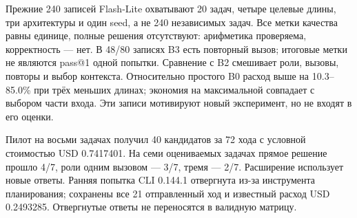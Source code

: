 
Прежние 240 записей Flash-Lite охватывают 20 задач, четыре целевые длины, три архитектуры и один seed, а не 240 независимых задач. Все метки качества равны единице, полные решения отсутствуют: арифметика проверяема, корректность --- нет. В 48/80 записях B3 есть повторный вызов; итоговые метки не являются pass@1 одной попытки. Сравнение с B2 смешивает роли, вызовы, повторы и выбор контекста. Относительно простого B0 расход выше на 10.3--85.0\% при трёх меньших длинах; экономия на максимальной совпадает с выбором части входа. Эти записи мотивируют новый эксперимент, но не входят в его оценки.

Пилот на восьми задачах получил 40 кандидатов за 72 хода с условной стоимостью USD 0.7417401. На семи оцениваемых задачах прямое решение прошло 4/7, роли одним вызовом --- 3/7, тремя --- 2/7. Расширение использует новые ответы. Ранняя попытка CLI 0.144.1 отвергнута из-за инструмента планирования; сохранены все 21 отправленный ход и известный расход USD 0.2493285. Отвергнутые ответы не переносятся в валидную матрицу.

